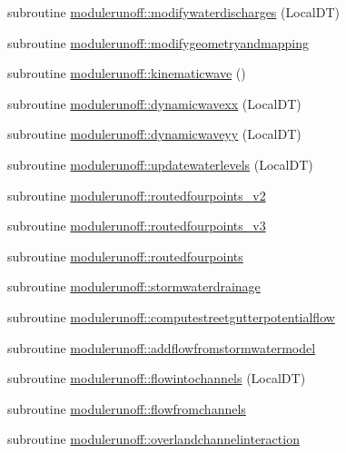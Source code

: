 \begin{DoxyCompactItemize}
\item 
subroutine \mbox{\hyperlink{namespacemodulerunoff_aadda9f593eae7a9fbebc7ae31f4e847b}{modulerunoff\+::modifywaterdischarges}} (Local\+DT)
\item 
subroutine \mbox{\hyperlink{namespacemodulerunoff_a5ae3563ef43601cbe338d999deca7e2b}{modulerunoff\+::modifygeometryandmapping}}
\item 
subroutine \mbox{\hyperlink{namespacemodulerunoff_ac9ce40d4e0d4a7a1faa6f0a7fd6eca2f}{modulerunoff\+::kinematicwave}} ()
\item 
subroutine \mbox{\hyperlink{namespacemodulerunoff_a18db45ec88a4cf69a97c7b95648bc264}{modulerunoff\+::dynamicwavexx}} (Local\+DT)
\item 
subroutine \mbox{\hyperlink{namespacemodulerunoff_a86d4b0ce5f4e6efc7d53702b40d97604}{modulerunoff\+::dynamicwaveyy}} (Local\+DT)
\item 
subroutine \mbox{\hyperlink{namespacemodulerunoff_ae21623961ce63cf7c148437e7ad9d934}{modulerunoff\+::updatewaterlevels}} (Local\+DT)
\item 
subroutine \mbox{\hyperlink{namespacemodulerunoff_aeedcf3916bc6da030fd004afb251262f}{modulerunoff\+::routedfourpoints\+\_\+v2}}
\item 
subroutine \mbox{\hyperlink{namespacemodulerunoff_a7ca1b43ca23fdb3f25a304ec7ea33a92}{modulerunoff\+::routedfourpoints\+\_\+v3}}
\item 
subroutine \mbox{\hyperlink{namespacemodulerunoff_a0a2296b090b1a35c74f3a4c0e35ad401}{modulerunoff\+::routedfourpoints}}
\item 
subroutine \mbox{\hyperlink{namespacemodulerunoff_af4d68602fac4df4d58a06a8d87433a3b}{modulerunoff\+::stormwaterdrainage}}
\item 
subroutine \mbox{\hyperlink{namespacemodulerunoff_a275dc22b830688ac27f2e1ab0cec626c}{modulerunoff\+::computestreetgutterpotentialflow}}
\item 
subroutine \mbox{\hyperlink{namespacemodulerunoff_abba7c93964c033b2908d8af2d841a8db}{modulerunoff\+::addflowfromstormwatermodel}}
\item 
subroutine \mbox{\hyperlink{namespacemodulerunoff_a08312a51cf0c25b5c2019c42750e1673}{modulerunoff\+::flowintochannels}} (Local\+DT)
\item 
subroutine \mbox{\hyperlink{namespacemodulerunoff_ad9add85fb1e5efe5eb239bb72e597945}{modulerunoff\+::flowfromchannels}}
\item 
subroutine \mbox{\hyperlink{namespacemodulerunoff_a5181922fc72d5c17acb9fdf3127d6318}{modulerunoff\+::overlandchannelinteraction}}

\end{DoxyCompactItemize}
